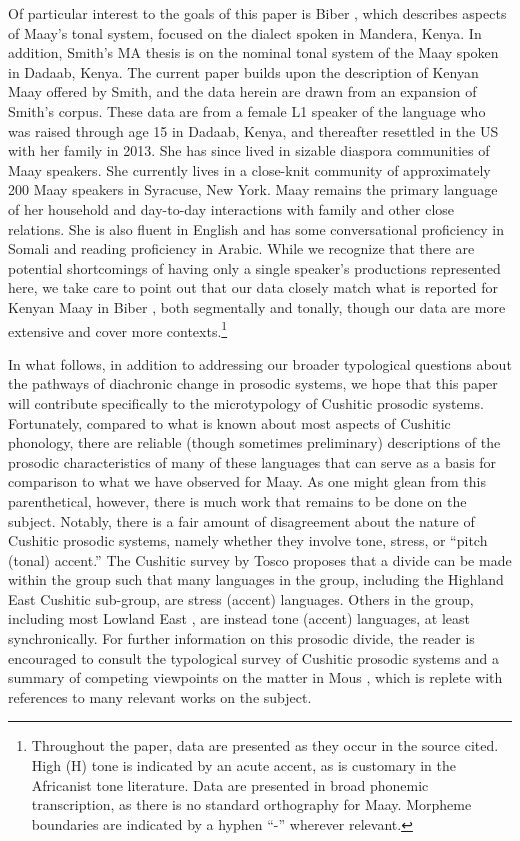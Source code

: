 \documentclass[output=paper,colorlinks,citecolor=brown]{langscibook}
\begin{document}
Of particular interest to the goals of this paper is Biber \citeyearpar{Biber1982}, which describes aspects of Maay's tonal system, focused on the dialect spoken in Mandera, Kenya. In addition, Smith's \citeyearpar{Smith2022} MA thesis is on the nominal tonal system of the Maay spoken in Dadaab, Kenya. The current paper builds upon the description of Kenyan Maay offered by Smith, and the data herein are drawn from an expansion of Smith's corpus. These data are from a female L1 speaker of the language who was raised through age 15 in Dadaab, Kenya, and thereafter resettled in the US with her family in 2013. She has since lived in sizable diaspora communities of Maay speakers. She currently lives in a close-knit community of approximately 200 Maay speakers in Syracuse, New York. Maay remains the primary language of her household and day-to-day interactions with family and other close relations. She is also fluent in English and has some conversational proficiency in Somali and reading proficiency in Arabic. While we recognize that there are potential shortcomings of having only a single speaker's productions represented here, we take care to point out that our data closely match what is reported for Kenyan Maay in Biber \citeyearpar{Biber1982}, both segmentally and tonally, though our data are more extensive and cover more contexts.\footnote{Throughout the paper, data are presented as they occur in the source cited. High (H) tone is indicated by an acute accent, as is customary in the Africanist tone literature. Data are presented in broad phonemic transcription, as there is no standard orthography for Maay. Morpheme boundaries are indicated by a hyphen “-” wherever relevant.}

In what follows, in addition to addressing our broader typological questions about the pathways of diachronic change in prosodic systems, we hope that this paper will contribute specifically to the microtypology of Cushitic prosodic systems. Fortunately, compared to what is known about most aspects of Cushitic phonology, there are reliable (though sometimes preliminary) descriptions of the prosodic characteristics of many of these languages that can serve as a basis for comparison to what we have observed for Maay. As one might glean from this parenthetical, however, there is much work that remains to be done on the subject. Notably, there is a fair amount of disagreement about the nature of Cushitic prosodic systems, namely whether they involve tone, stress, or ``pitch (tonal) accent.'' The Cushitic survey by Tosco \citeyearpar{Tosco2000} proposes that a divide can be made within the group such that many languages in the group, including the Highland East Cushitic sub-group, are stress (accent) languages. Others in the group, including most Lowland East , are instead tone (accent) languages, at least synchronically. For further information on this prosodic divide, the reader is encouraged to consult the typological survey of Cushitic prosodic systems and a summary of competing viewpoints on the matter in Mous \citeyearpar{Mous2021}, which is replete with references to many relevant works on the subject. 
\end{document}

